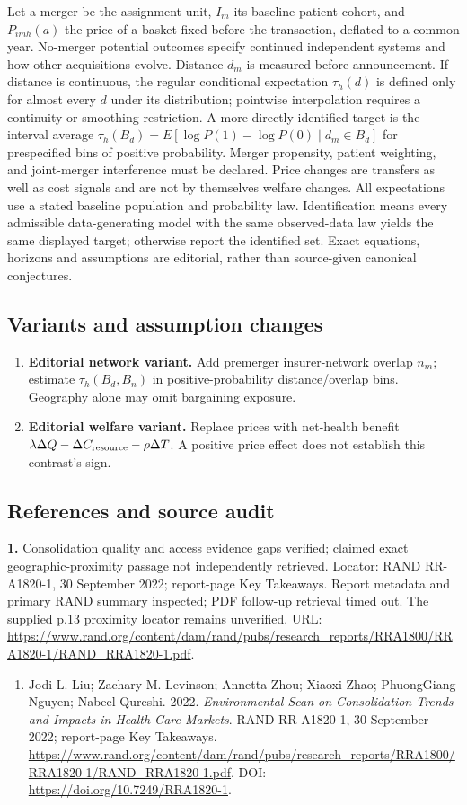 \documentclass[11pt,a4paper]{article}
\begin{document}
Let a merger be the assignment unit, \(I_m\) its baseline patient cohort, and \(P_{imh}(a)\) the price of a basket fixed before the transaction, deflated to a common year. No-merger potential outcomes specify continued independent systems and how other acquisitions evolve. Distance \(d_m\) is measured before announcement. If distance is continuous, the regular conditional expectation \(\tau_h(d)\) is defined only for almost every \(d\) under its distribution; pointwise interpolation requires a continuity or smoothing restriction. A more directly identified target is the interval average \(\tau_h(B_d)=E[\log P(1)-\log P(0)\mid d_m\in B_d]\) for prespecified bins of positive probability. Merger propensity, patient weighting, and joint-merger interference must be declared. Price changes are transfers as well as cost signals and are not by themselves welfare changes. All expectations use a stated baseline population and probability law. Identification means every admissible data-generating model with the same observed-data law yields the same displayed target; otherwise report the identified set. Exact equations, horizons and assumptions are editorial, rather than source-given canonical conjectures.
\subsection*{Variants and assumption changes}
\begin{enumerate}
\item \textbf{Editorial network variant.} Add premerger insurer-network overlap \(n_m\); estimate \(\tau_h(B_d,B_n)\) in positive-probability distance/overlap bins. Geography alone may omit bargaining exposure.
\item \textbf{Editorial welfare variant.} Replace prices with net-health benefit \(\lambda\Delta Q-\Delta C_{\rm resource}-\rho\Delta T\). A positive price effect does not establish this contrast's sign.
\end{enumerate}
\subsection*{References and source audit}
\textbf{1.} Consolidation quality and access evidence gaps verified; claimed exact geographic-proximity passage not independently retrieved. Locator: RAND RR-A1820-1, 30 September 2022; report-page Key Takeaways. Report metadata and primary RAND summary inspected; PDF follow-up retrieval timed out. The supplied p.13 proximity locator remains unverified. URL: \url{https://www.rand.org/content/dam/rand/pubs/research_reports/RRA1800/RRA1820-1/RAND_RRA1820-1.pdf}.
\begin{enumerate}\raggedright
\item\hypertarget{definitions:source:30007722:1}{} Jodi L. Liu; Zachary M. Levinson; Annetta Zhou; Xiaoxi Zhao; PhuongGiang Nguyen; Nabeel Qureshi. 2022. \emph{Environmental Scan on Consolidation Trends and Impacts in Health Care Markets}. RAND RR-A1820-1, 30 September 2022; report-page Key Takeaways.
\url{https://www.rand.org/content/dam/rand/pubs/research_reports/RRA1800/RRA1820-1/RAND_RRA1820-1.pdf}.
DOI: \url{https://doi.org/10.7249/RRA1820-1}.
\end{enumerate}
\end{document}
